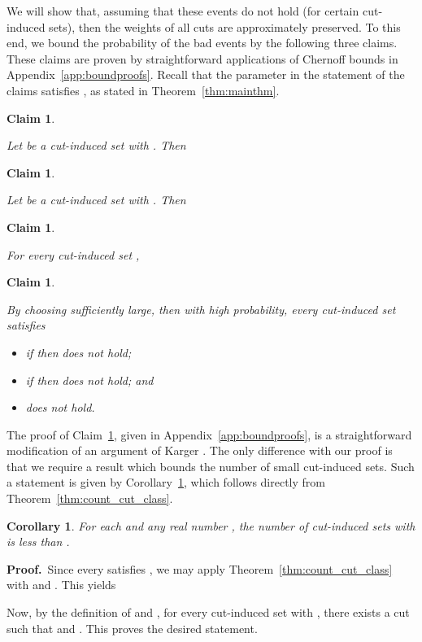 \documentclass[11pt]{article}
\newcommand{\proofbelow}{8pt}
\numberwithin{equation}{section}
\newtheorem{corollary}[theorem]{Corollary}
\newtheorem{claim}[theorem]{Claim}
\renewenvironment{proof}{\noindent\textbf{Proof.}\,}{\afterproof}
\newcommand{\afterproof}{\hfill  \par \vspace{\proofbelow}}
\newcommand{\Appendix}[1]{Appendix~\ref{app:#1}}
\newcommand{\ClaimName}[1]{\label{clm:#1}}
\newcommand{\Claim}[1]{Claim~\ref{clm:#1}}
\newcommand{\CorollaryName}[1]{\label{cor:#1}}
\newcommand{\Corollary}[1]{Corollary~\ref{cor:#1}}
\newcommand{\Theorem}[1]{Theorem~\ref{thm:#1}}
\begin{document}
We will show that,
assuming that these events do not hold (for certain cut-induced sets),
then the weights of all cuts are approximately preserved.
To this end, we bound the probability of the bad events
by the following three claims.
These claims are proven by straightforward applications of Chernoff bounds
in \Appendix{boundproofs}.
Recall that the parameter  in the statement of the claims
satisfies , as stated in \Theorem{mainthm}.


\newcommand{\clmlargelambda}{
    Let  be a cut-induced set with .
    Then
    
}
\begin{claim}
\ClaimName{large_lambda}
\clmlargelambda
\end{claim}

\newcommand{\clmsmalllambda}{
    Let  be a cut-induced set with .
    Then
    
}
\begin{claim}
\ClaimName{small_lambda}
\clmsmalllambda
\end{claim}

\newcommand{\clmerrorub}{
    For every cut-induced set ,
    
}
\begin{claim}
\ClaimName{errorub}
\clmerrorub
\end{claim}

\newcommand{\clmunionbound}{
    By choosing  sufficiently large,
    then with high probability, every cut-induced set  satisfies
    \begin{itemize}
    \item if  then  does not hold;
    \item if  then  does not hold; and
    \item  does not hold.
    \end{itemize}
}
\begin{claim}
\ClaimName{union_bound}
\clmunionbound
\end{claim}

The proof of \Claim{union_bound}, given in \Appendix{boundproofs},
is a straightforward modification of an argument of Karger \cite{KargerSkel}.
The only difference with our proof is that we require a result which
bounds the number of small cut-induced sets.
Such a statement is given by \Corollary{count_canonical_cut},
which follows directly from \Theorem{count_cut_class}.

\begin{corollary}
\CorollaryName{count_canonical_cut}
For each  and any real number , 
the number of cut-induced sets  with 
is less than .
\end{corollary}
\begin{proof}
Since every  satisfies ,
we may apply \Theorem{count_cut_class} with  and .
This yields 

Now, by the definition of  and ,
for every cut-induced set  with ,
there exists a cut  such that 
and .
This proves the desired statement.
\end{proof}
\end{document}
